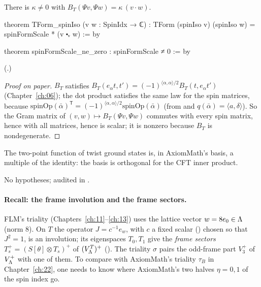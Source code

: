 \begin{theorem}\label{ch21:thm:TForm}
There is $\kappa\ne0$ with $B_T(\Psi v,\Psi w)=\kappa\,(v\cdot w)$.
\end{theorem}
\begin{leancode}
theorem TForm_spinIso (v w : SpinIdx → ℂ) :
    TForm (spinIso v) (spinIso w) = spinFormScale * (v ⬝ᵥ w) := by
\end{leancode}
\begin{leancode}
theorem spinFormScale_ne_zero : spinFormScale ≠ 0 := by
\end{leancode}
(.)
\begin{proof}[Proof on paper]
$B_T$ satisfies $B_T(e_\alpha t,t')=(-1)^{\langle\alpha,\alpha\rangle/2}B_T(t,e_\alpha t')$ (Chapter~\ref{ch:06}); the
dot product satisfies the same law for the spin matrices, because
$\mathrm{spinOp}(\bar\alpha)^{\mathsf T}=(-1)^{\langle\alpha,\alpha\rangle/2}\mathrm{spinOp}(\bar\alpha)$
(from  and $q(\bar\alpha)=\langle a,\delta\rangle$).  So the Gram matrix of
$(v,w)\mapsto B_T(\Psi v,\Psi w)$ commutes with every spin matrix, hence with all matrices, hence is
scalar; it is nonzero because $B_T$ is nondegenerate.
\end{proof}
\begin{physics}
The two-point function of twist ground states is, in AxiomMath's basis, a multiple of the identity:
the basis is orthogonal for the CFT inner product.
\end{physics}
\begin{status}
No hypotheses; audited in .
\end{status}

\paragraph{Recall: the frame involution and the frame sectors.}  FLM's triality
(Chapters~\ref{ch:11}--\ref{ch:13}) uses the lattice vector $w=8e_0\in{\Lambda}$ (norm $8$).  On $T$ the
operator $J=c^{-1}e_w$, with $c$ a fixed scalar () chosen so that $J^2=1$,
is an involution; its eigenspaces $T_0,T_1$ give the \emph{frame sectors} $T_s^+=(S[\theta]\otimes T_s)^+$ of
$(V_{\Lambda}^T)^+$ ().  The triality $\sigma$ pairs the odd-frame part $V_3^+$ of $V_{\Lambda}^+$ with
one of them.  To compare with AxiomMath's triality $\tau_B$ in Chapter~\ref{ch:22}, one needs to know
where AxiomMath's two halves $\eta=0,1$ of the spin index go.

